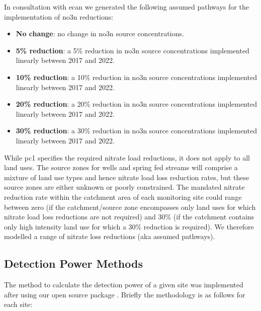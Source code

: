 In consultation with \gls{ecan} we generated the following assumed pathways for the implementation of \gls{no3n} reductions:
\begin{itemize}
    \item \textbf{No change}: no change in \gls{no3n} source concentrations.
    \item \textbf{5\% reduction}: a 5\% reduction in \gls{no3n} source concentrations implemented linearly between 2017 and 2022.
    \item \textbf{10\% reduction}: a 10\% reduction in \gls{no3n} source concentrations implemented linearly between 2017 and 2022.
    \item \textbf{20\% reduction}: a 20\% reduction in \gls{no3n} source concentrations implemented linearly between 2017 and 2022.
    \item \textbf{30\% reduction}: a 30\% reduction in \gls{no3n} source concentrations implemented linearly between 2017 and 2022.
\end{itemize}

While \gls{pc1} specifies the required nitrate load reductions, it does not apply to all land uses.
The source zones for wells and spring fed streams will comprise a mixture of land use types and hence nitrate load loss reduction rates, but these source zones are either unknown or poorly constrained.
The mandated nitrate reduction rate within the catchment area of each monitoring site could range between zero (if the catchment/source zone encompasses only land uses for which nitrate load loss reductions are not required) and 30\% (if the catchment contains only high intensity land use for which a 30\% reduction is required).
We therefore modelled a range of nitrate loss reductions (aka assumed pathways).

\subsection[Detection Power Methods] {Detection Power Methods} \label{subsec:detection_power_methods}

The method to calculate the detection power of a given site was implemented after \citet{dumont_determining_nodate}
using our open source package \citep{dumont_komanawagw_detect_power_2023}.
Briefly the methodology is as follows for each site:

